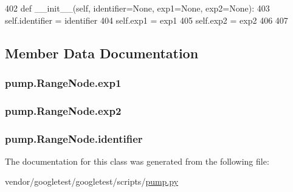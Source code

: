 \begin{DoxyCode}
402   \textcolor{keyword}{def }\_\_init\_\_(self, identifier=None, exp1=None, exp2=None):
403     self.identifier = identifier
404     self.exp1 = exp1
405     self.exp2 = exp2
406 
407 
\end{DoxyCode}


\subsection{Member Data Documentation}
\subsubsection[{\texorpdfstring{exp1}{exp1}}]{\setlength{\rightskip}{0pt plus 5cm}pump.\+Range\+Node.\+exp1}\hypertarget{classpump_1_1RangeNode_acbb59f8c5e23d23563ca03f21574ce63}{}\label{classpump_1_1RangeNode_acbb59f8c5e23d23563ca03f21574ce63}
\subsubsection[{\texorpdfstring{exp2}{exp2}}]{\setlength{\rightskip}{0pt plus 5cm}pump.\+Range\+Node.\+exp2}\hypertarget{classpump_1_1RangeNode_afe153ee472b121652a51c62c1522cc13}{}\label{classpump_1_1RangeNode_afe153ee472b121652a51c62c1522cc13}
\subsubsection[{\texorpdfstring{identifier}{identifier}}]{\setlength{\rightskip}{0pt plus 5cm}pump.\+Range\+Node.\+identifier}\hypertarget{classpump_1_1RangeNode_ae75b9f31ba8c3bd048cf09b22035efa0}{}\label{classpump_1_1RangeNode_ae75b9f31ba8c3bd048cf09b22035efa0}


The documentation for this class was generated from the following file\+:\begin{DoxyCompactItemize}
\item 
vendor/googletest/googletest/scripts/\hyperlink{pump_8py}{pump.\+py}\end{DoxyCompactItemize}
